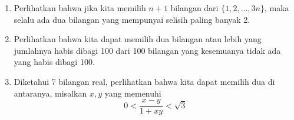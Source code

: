 \documentclass[12pt]{scrartcl}
\begin{document}
\begin{enumerate}
    \item Perlihatkan bahwa jika kita memilih $n + 1$ bilangan dari $\{1, 2, \ldots, 3n\}$, maka selalu ada dua bilangan yang mempunyai selisih paling banyak 2.
    

    \item Perlihatkan bahwa kita dapat memilih dua bilangan atau lebih yang jumlahnya habis dibagi 100 dari 100 bilangan yang kesemuanya tidak ada yang habis dibagi 100.
    \item Diketahui 7 bilangan real, perlihatkan bahwa kita dapat memilih dua di antaranya, misalkan $x, y$ yang memenuhi
    \[ 0 < \frac{x - y}{1 + xy} < \sqrt{3} \]

\end{enumerate}
\end{document}
